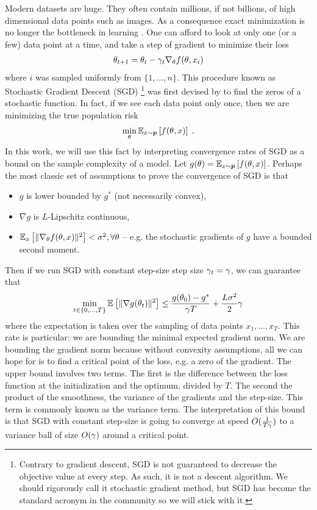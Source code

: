 Modern datasets are huge. They often contain millions, if not billions, of high dimensional data points such as images. As a consequence exact minimization is no longer the bottleneck in learning \citep{bottou2008tradeoffs}. 
One can afford to look at only one (or a few) data point at a time, and take a step of gradient to minimize their loss
\begin{align}
    \theta_{t+1} = \theta_t - \lr_t \nabla_\theta f(\theta, x_i)
\end{align}
where $i$ was sampled uniformly from $\{1, \dots, n\}$.
This procedure known as Stochastic Gradient Descent (SGD)
\footnote{Contrary to gradient descent, SGD is not guaranteed to decrease the objective value at every step. As such, it is not a descent algorithm. We should rigorously call it stochastic gradient method, but SGD has become the standard acronym in the community so we will stick with it.}
was first devised by \citet{robbins1951stochastic} to find the zeros of a stochastic function.
In fact, if we see each data point only once, then we are minimizing the true population risk 
\begin{align}
    \min_\theta \expect[x\sim \ptrue]{f(\theta, x)} \; .
\end{align}
In this work, we will use this fact by interpreting convergence rates  of SGD as a bound on the sample complexity of a model. 
Let $g(\theta) = \expect[x\sim \ptrue]{f(\theta, x)}$. Perhaps the most classic set of assumptions to prove the convergence of SGD is that 
\begin{itemize}
    \item $g$ is lower bounded by $g^*$ (not necessarily convex),
    \item $\nabla g$ is $L$-Lipschitz continuous,
    \item $\expect[x]{\|\nabla_\theta f(\theta, x)\|^2} < \sigma^2, \forall \theta$ -- e.g. the stochastic gradients of $g$ have a bounded second moment.
\end{itemize}
Then if we run SGD with constant step-size step size $\lr_t = \lr$, we can guarantee that
\begin{align}
    \min_{t\in \{0, \dots, T\} } \expect{\|\nabla g(\theta_t)\|^2} 
    \leq \frac{g(\theta_0) - g^*}{\lr T} + \frac{L \sigma^2}{2} \lr 
\end{align}
where the expectation is taken over the sampling of data points $x_1, \dots, x_T$. 
This rate is particular: we are bounding the minimal expected gradient norm. We are bounding the gradient norm because without convexity assumptions, all we can hope for is to find a critical point of the loss, e.g. a zero of the gradient. 
The upper bound involves two terms. The first is the difference between the loss function at the initialization and the optimum, divided by $T$. The second the product of the smoothness, the variance of the gradients and the step-size. This term is commonly known as the variance term. The interpretation of this bound is that SGD with constant step-size is going to converge at speed $O(\inv{T \lr})$ to a variance ball of size $O(\lr)$ around a critical point.

